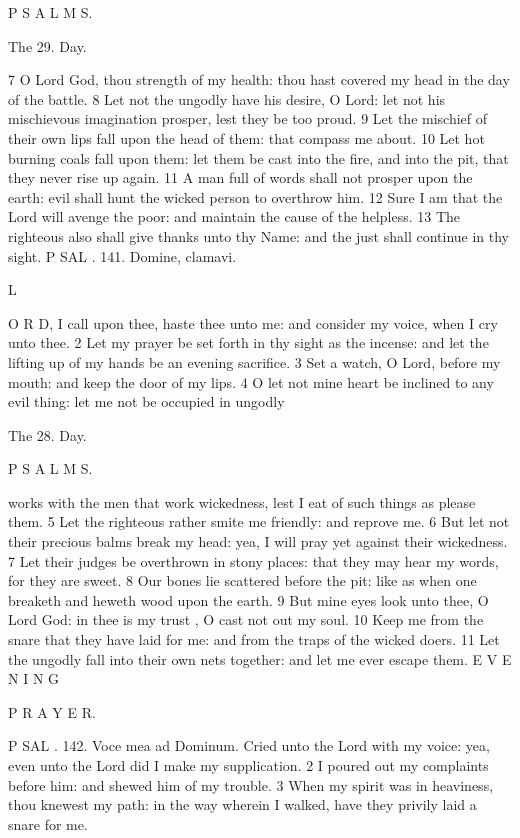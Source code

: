 P S A L M S.

The 29. Day.

7 O Lord God, thou strength of my health: thou hast covered my head in the day of the battle. 8 Let not the ungodly have his desire, O Lord: let not his mischievous imagination prosper, lest they be too proud. 9 Let the mischief of their own lips fall upon the head of them: that compass me about. 10 Let hot burning coals fall upon them: let them be cast into the fire, and into the pit, that they never rise up again. 11 A man full of words shall not prosper upon the earth: evil shall hunt the wicked person to overthrow him. 12 Sure I am that the Lord will avenge the poor: and maintain the cause of the helpless. 13 The righteous also shall give thanks unto thy Name: and the just shall continue in thy sight. P SAL . 141. Domine, clamavi.

L

O R D, I call upon thee, haste thee unto me: and consider my voice, when I cry unto thee. 2 Let my prayer be set forth in thy sight as the incense: and let the lifting up of my hands be an evening sacrifice. 3 Set a watch, O Lord, before my mouth: and keep the door of my lips. 4 O let not mine heart be inclined to any evil thing: let me not be occupied in ungodly

The 28. Day.

P S A L M S.

works with the men that work wickedness, lest I eat of such things as please them. 5 Let the righteous rather smite me friendly: and reprove me. 6 But let not their precious balms break my head: yea, I will pray yet against their wickedness. 7 Let their judges be overthrown in stony places: that they may hear my words, for they are sweet. 8 Our bones lie scattered before the pit: like as when one breaketh and heweth wood upon the earth. 9 But mine eyes look unto thee, O Lord God: in thee is my trust , O cast not out my soul. 10 Keep me from the snare that they have laid for me: and from the traps of the wicked doers. 11 Let the ungodly fall into their own nets together: and let me ever escape them. E V E N I N G

P R A Y E R.

P SAL . 142. Voce mea ad Dominum. Cried unto the Lord with my voice: yea, even unto the Lord did I make my supplication. 2 I poured out my complaints before him: and shewed him of my trouble. 3 When my spirit was in heaviness, thou knewest my path: in the way wherein I walked, have they privily laid a snare for me.

